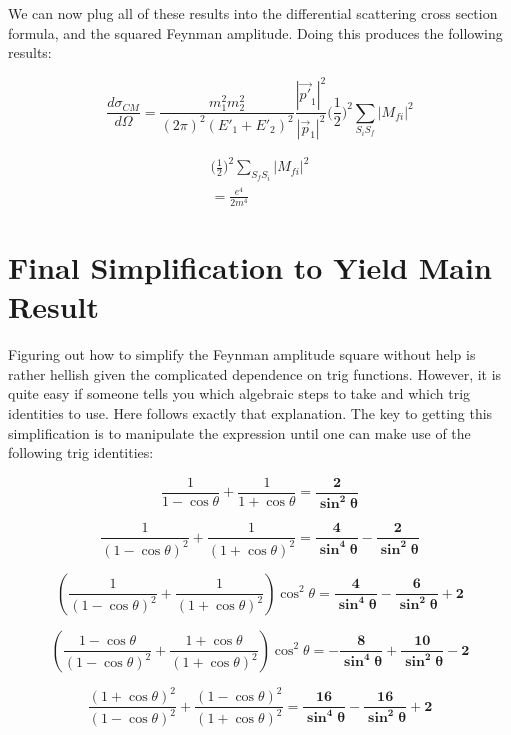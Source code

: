 \documentclass[a4]{article}
\begin{document}
    We can now plug all of these results into the differential scattering cross section formula, and the squared Feynman amplitude. Doing this produces the following results:

    \begin{equation}
        \frac{d \sigma_{CM}}{d \Omega} = \frac{m_1^2 m_2^2}{(2 \pi)^2 (E'_1 + E'_2)^2} \frac{|\vec{p'}_1|^2}{|\vec{p}_1|^2} \bigg( \frac{1}{2} \bigg)^2 \sum_{S_i S_f} |M_{fi}|^2
    \end{equation}

    \begin{eqnarray}
        \bigg( \frac{1}{2} \bigg)^2 \sum_{S_f S_i} |M_{f i}|^2 \\
        = \frac{e^4}{2 m^4}
    \end{eqnarray}

    \section*{Final Simplification to Yield Main Result}

    Figuring out how to simplify the Feynman amplitude square without help is rather hellish given the complicated dependence on trig functions. However, it is quite easy if someone tells you which algebraic steps to take and which trig identities
    to use. Here follows exactly that explanation. The key to getting this simplification is to manipulate the expression until one can make use of the following trig identities:

    \begin{framed}

        \begin{equation}
            \frac{1}{1 - \cos \theta} + \frac{1}{1 + \cos \theta} = \mathbf{\frac{2}{\sin^2 \theta}}
        \end{equation}

        \begin{equation}
            \frac{1}{(1 - \cos \theta)^2} + \frac{1}{(1 + \cos \theta)^2} = \mathbf{\frac{4}{\sin^4 \theta} - \frac{2}{\sin^2 \theta}}
        \end{equation}

        \begin{equation}
            (\frac{1}{(1 - \cos \theta)^2} + \frac{1}{(1 + \cos \theta)^2}) \cos^2 \theta = \mathbf{\frac{4}{\sin^4 \theta} - \frac{6}{\sin^2 \theta} + 2}
        \end{equation}
 
        \begin{equation}
            (\frac{1 - \cos \theta}{(1 - \cos \theta)^2} + \frac{1 + \cos \theta}{(1 + \cos \theta)^2}) \cos^2 \theta = \mathbf{- \frac{8}{\sin^4 \theta} + \frac{10}{\sin^2 \theta} - 2}
        \end{equation}

        \begin{equation}
            \frac{(1 + \cos \theta)^2}{(1 - \cos \theta)^2} + \frac{(1 - \cos \theta)^2}{(1 + \cos \theta)^2} = \mathbf{\frac{16}{\sin^4 \theta} - \frac{16}{\sin^2 \theta} + 2}
        \end{equation}

    \end{framed}
\end{document}
